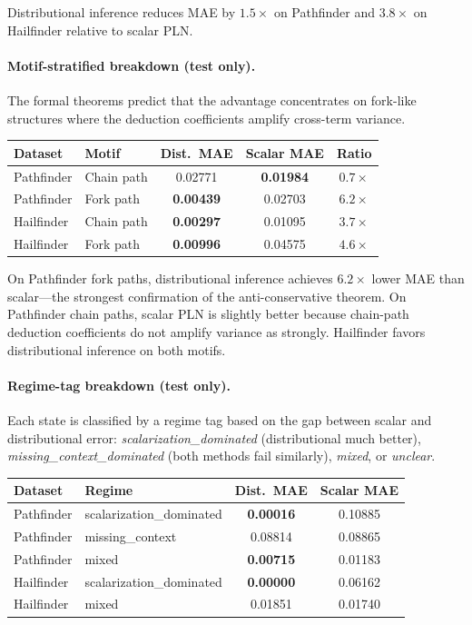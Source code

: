 \documentclass[11pt,openany]{report}
\begin{document}
Distributional inference reduces MAE by $1.5\times$ on Pathfinder and
$3.8\times$ on Hailfinder relative to scalar PLN.

\paragraph{Motif-stratified breakdown (test only).}

The formal theorems predict that the advantage concentrates on
fork-like structures where the deduction coefficients amplify
cross-term variance.

\begin{center}
\begin{tabular}{llccc}
\toprule
\textbf{Dataset} & \textbf{Motif} & \textbf{Dist.\ MAE} & \textbf{Scalar MAE}
  & \textbf{Ratio} \\
\midrule
Pathfinder & Chain path & 0.02771 & \textbf{0.01984} & $0.7\times$ \\
Pathfinder & Fork path  & \textbf{0.00439} & 0.02703 & $6.2\times$ \\
\midrule
Hailfinder & Chain path & \textbf{0.00297} & 0.01095 & $3.7\times$ \\
Hailfinder & Fork path  & \textbf{0.00996} & 0.04575 & $4.6\times$ \\
\bottomrule
\end{tabular}
\end{center}

On Pathfinder fork paths, distributional inference achieves $6.2\times$
lower MAE than scalar---the strongest confirmation of the anti-conservative
theorem.  On Pathfinder chain paths, scalar PLN is slightly better because
chain-path deduction coefficients do not amplify variance as strongly.
Hailfinder favors distributional inference on both motifs.

\paragraph{Regime-tag breakdown (test only).}

Each state is classified by a regime tag based on the gap between
scalar and distributional error:
\emph{scalarization\_dominated} (distributional much better),
\emph{missing\_context\_dominated} (both methods fail similarly),
\emph{mixed}, or \emph{unclear}.

\begin{center}
\begin{tabular}{llcc}
\toprule
\textbf{Dataset} & \textbf{Regime} & \textbf{Dist.\ MAE} & \textbf{Scalar MAE} \\
\midrule
Pathfinder & scalarization\_dominated & \textbf{0.00016} & 0.10885 \\
Pathfinder & missing\_context         & 0.08814 & 0.08865 \\
Pathfinder & mixed                    & \textbf{0.00715} & 0.01183 \\
\midrule
Hailfinder & scalarization\_dominated & \textbf{0.00000} & 0.06162 \\
Hailfinder & mixed                    & 0.01851 & 0.01740 \\
\bottomrule
\end{tabular}
\end{center}
\end{document}
